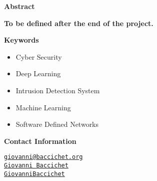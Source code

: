 \thispagestyle{empty}

{\bf\Huge Abstract}

\vspace{1cm}

\faEdit \quad \textbf{To be defined after the end of the project.} \\

\textcolor{dimgray}{\lipsum[1-3]}

\vspace{1cm}

{\bf\Huge Keywords}

\vspace{1cm}

\begin{itemize}
    \item[\faCaretRight] Cyber Security
    \item[\faCaretRight] Deep Learning
    \item[\faCaretRight] Intrusion Detection System
    \item[\faCaretRight] Machine Learning
    \item[\faCaretRight] Software Defined Networks
\end{itemize}

\vspace{1cm}

{\bf\Huge Contact Information}

\vspace{1cm}

\faEnvelopeO \quad \href{mailto:giovanni@baccichet.org}{\texttt{giovanni@baccichet.org}} \\

\faLinkedin \quad \href{https://www.linkedin.com/in/giovanni-baccichet/}{\texttt{Giovanni Baccichet}} \\

\faGithub \quad \href{https://github.com/GiovanniBaccichet}{\texttt{GiovanniBaccichet}}